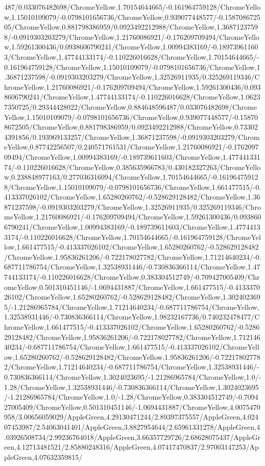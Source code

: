 {\begin{tikzternal}
487/0.033076482698/ChromeYellow,1.70154644665/-0.161964759128/ChromeYellow,1.15010109079/-0.0798101656736/ChromeYellow,0.939077448577/-0.158708672505/ChromeYellow,0.881798386959/0.0923492212988/ChromeYellow,1.36871237598/-0.0919303203279/ChromeYellow,1.21760086921/-0.176209709494/ChromeYellow,1.59261300436/0.0938606790241/ChromeYellow,1.00994383169/-0.189739611603/ChromeYellow,1.47744133174/-0.110226016628/ChromeYellow,1.70154644665/-0.161964759128/ChromeYellow,1.15010109079/-0.0798101656736/ChromeYellow,1.36871237598/-0.0919303203279/ChromeYellow,1.32526911935/0.325269119346/ChromeYellow,1.21760086921/-0.176209709494/ChromeYellow,1.59261300436/0.0938606790241/ChromeYellow,1.47744133174/-0.110226016628/ChromeYellow,1.06237350725/0.29344428022/ChromeYellow,0.884648596487/0.033076482698/ChromeYellow,1.15010109079/-0.0798101656736/ChromeYellow,0.939077448577/-0.158708672505/ChromeYellow,0.881798386959/0.0923492212988/ChromeYellow,0.733024391856/0.193969133257/ChromeYellow,1.36871237598/-0.0919303203279/ChromeYellow,0.87742256507/0.240571761531/ChromeYellow,1.21760086921/-0.176209709494/ChromeYellow,1.00994383169/-0.189739611603/ChromeYellow,1.47744133174/-0.110226016628/ChromeYellow,0.385635966783/0.430182327263/ChromeYellow,0.238848977163/0.277036316094/ChromeYellow,1.70154644665/-0.161964759128/ChromeYellow,1.15010109079/-0.0798101656736/ChromeYellow,1.661477515/-0.413337026102/ChromeYellow,1.65280260762/-0.528629128482/ChromeYellow,1.36871237598/-0.0919303203279/ChromeYellow,1.32526911935/0.325269119346/ChromeYellow,1.21760086921/-0.176209709494/ChromeYellow,1.59261300436/0.0938606790241/ChromeYellow,1.00994383169/-0.189739611603/ChromeYellow,1.47744133174/-0.110226016628/ChromeYellow,1.70154644665/-0.161964759128/ChromeYellow,1.661477515/-0.413337026102/ChromeYellow,1.65280260762/-0.528629128482/ChromeYellow,1.95836261206/-0.722178027782/ChromeYellow,1.71214640234/-0.687711786754/ChromeYellow,1.32538931446/-0.730836366114/ChromeYellow,1.47744133174/-0.110226016628/ChromeYellow,0.383304512749/-0.709427005409/ChromeYellow,0.501310451146/-1.0694431887/ChromeYellow,1.661477515/-0.413337026102/ChromeYellow,1.65280260762/-0.528629128482/ChromeYellow,1.3024023695/-1.21286965784/ChromeYellow,1.71214640234/-0.687711786754/ChromeYellow,1.32538931446/-0.730836366114/ChromeYellow,1.98232167736/0.740232478477/ChromeYellow,1.661477515/-0.413337026102/ChromeYellow,1.65280260762/-0.528629128482/ChromeYellow,1.95836261206/-0.722178027782/ChromeYellow,1.71214640234/-0.687711786754/ChromeYellow,1.661477515/-0.413337026102/ChromeYellow,1.65280260762/-0.528629128482/ChromeYellow,1.95836261206/-0.722178027782/ChromeYellow,1.71214640234/-0.687711786754/ChromeYellow,1.32538931446/-0.730836366114/ChromeYellow,1.3024023695/-1.21286965784/ChromeYellow,1.0/-1.28/ChromeYellow,1.32538931446/-0.730836366114/ChromeYellow,1.3024023695/-1.21286965784/ChromeYellow,1.0/-1.28/ChromeYellow,0.383304512749/-0.709427005409/ChromeYellow,0.501310451146/-1.0694431887/ChromeYellow,4.0075470958/3.00656059029/AppleGreen,4.29130471244/2.89397375557/AppleGreen,4.02407453987/2.54063041401/AppleGreen,3.8827954644/2.65961331278/AppleGreen,4.03926508734/2.99236764018/AppleGreen,3.66357729726/2.68628075437/AppleGreen,4.12713481521/2.85880248316/AppleGreen,4.07417470837/2.97003147253/AppleGreen,4.07632359815/
\end{tikzternal}}
